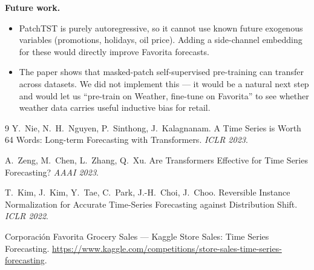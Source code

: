 \documentclass[11pt]{article}
\begin{document}
\textbf{Future work.}
\begin{itemize}
    \item PatchTST is purely autoregressive, so it cannot use known future exogenous variables (promotions, holidays, oil price). Adding a side-channel embedding for these would directly improve Favorita forecasts.
    \item The paper shows that masked-patch self-supervised pre-training can transfer across datasets. We did not implement this --- it would be a natural next step and would let us ``pre-train on Weather, fine-tune on Favorita'' to see whether weather data carries useful inductive bias for retail.
\end{itemize}

\begin{thebibliography}{9}
\small
{}
Y.~Nie, N.~H.~Nguyen, P.~Sinthong, J.~Kalagnanam.
\newblock A Time Series is Worth 64 Words: Long-term Forecasting with Transformers.
\newblock \emph{ICLR 2023}.

A.~Zeng, M.~Chen, L.~Zhang, Q.~Xu.
\newblock Are Transformers Effective for Time Series Forecasting?
\newblock \emph{AAAI 2023}.

T.~Kim, J.~Kim, Y.~Tae, C.~Park, J.-H.~Choi, J.~Choo.
\newblock Reversible Instance Normalization for Accurate Time-Series Forecasting against Distribution Shift.
\newblock \emph{ICLR 2022}.

Corporaci\'on Favorita Grocery Sales --- Kaggle Store Sales: Time Series Forecasting.
\newblock \url{https://www.kaggle.com/competitions/store-sales-time-series-forecasting}.
\end{thebibliography}
\end{document}
